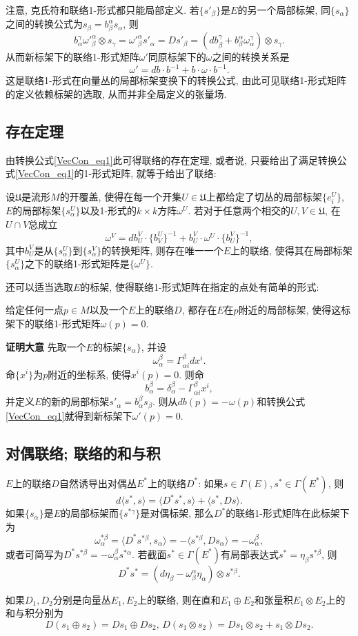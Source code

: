 注意, 克氏符和联络1-形式都只能局部定义. 若$\{s'_\beta\}$是$E$的另一个局部标架, 同$\{s_\alpha\}$之间的转换公式为$s_\beta=b_\beta^\alpha s_\alpha$, 则
$$
b_\alpha^\gamma{\omega'}_{\beta}^{\alpha}\otimes s_\gamma={\omega'}_{\beta}^{\alpha}s'_\alpha=Ds'_\beta=(db_\beta^\gamma+b_\beta^\alpha\omega_\alpha^\gamma)\otimes s_\gamma.
$$
从而新标架下的联络1-形式矩阵$\omega'$同原标架下的$\omega$之间的转换关系是
\begin{equation}\label{VecCon_eq1}
\omega'=db\cdot b^{-1}+b\cdot\omega\cdot b^{-1}.
\end{equation}
这是联络1-形式在向量丛的局部标架变换下的转换公式, 由此可见联络1-形式矩阵的定义依赖标架的选取, 从而并非全局定义的张量场.

\subsection{存在定理}
由转换公式\autoref{VecCon_eq1}此可得联络的存在定理, 或者说, 只要给出了满足转换公式\autoref{VecCon_eq1}的1-形式矩阵, 就等于给出了联络:
\begin{theorem}{}
设$\mathfrak{U}$是流形$M$的开覆盖, 使得在每一个开集$U\in\mathfrak{U}$上都给定了切丛的局部标架$\{e^U_i\}$, $E$的局部标架$\{s^U_\alpha\}$以及1-形式的$k\times k$方阵$\omega^U$. 若对于任意两个相交的$U,V\in\mathfrak{U}$, 在$U\cap V$总成立
$$
\omega^V=db^V_U\cdot \{b_V^U\}^{-1}+b^V_U\cdot\omega^U\cdot \{b^V_U\}^{-1},
$$
其中$b^V_U$是从$\{s^U_\alpha\}$到$\{s^V_\alpha\}$的转换矩阵, 则存在唯一一个$E$上的联络, 使得其在局部标架$\{s^U_\alpha\}$之下的联络1-形式矩阵是$\{\omega^U\}$.
\end{theorem}

还可以适当选取$E$的标架, 使得联络1-形式矩阵在指定的点处有简单的形式:
\begin{theorem}{}
给定任何一点$p\in M$以及一个$E$上的联络$D$, 都存在$E$在$p$附近的局部标架, 使得这标架下的联络1-形式矩阵$\omega(p)=0$.
\end{theorem}
\textbf{证明大意} 先取一个$E$的标架$\{s_\alpha\}$, 并设
$$
\omega^\beta_\alpha=\Gamma_{\alpha i}^\beta dx^i.
$$
命$\{x^i\}$为$p$附近的坐标系, 使得$x^i(p)=0$. 则命
$$
b_\alpha^\beta=\delta_\alpha^\beta-\Gamma_{\alpha i}^\beta x^i,
$$
并定义$E$的新的局部标架$s'_\alpha=b_\alpha^\beta s_\beta$. 则从$db(p)=-\omega(p)$和转换公式\autoref{VecCon_eq1}就得到新标架下$\omega'(p)=0$.

\subsection{对偶联络; 联络的和与积}
$E$上的联络$D$自然诱导出对偶丛$E^*$上的联络$D^*$: 如果$s\in\Gamma(E),s^*\in\Gamma(E^*)$, 则
$$
d\langle s^*,s\rangle=\langle D^*s^*,s\rangle+\langle s^*,Ds\rangle.
$$
如果$\{s_\alpha\}$是$E$的局部标架而$\{s^{*\gamma}\}$是对偶标架, 那么$D^*$的联络1-形式矩阵在此标架下为
$$
\omega^{*\beta}_\alpha
=\langle D^*s^{*\beta},s_\alpha\rangle
=-\langle s^{*\beta},Ds_\alpha\rangle
=-\omega^\beta_\alpha,
$$
或者可简写为$D^*s^{*\beta}=-\omega^\beta_\alpha s^{*\alpha}$. 若截面$s^*\in\Gamma(E^*)$有局部表达式$s^*=\eta_\beta s^{*\beta}$, 则
$$
D^*s^*=(d\eta_\beta-\omega_\beta^\alpha\eta_\alpha)\otimes s^{*\beta}.
$$

如果$D_1,D_2$分别是向量丛$E_1,E_2$上的联络, 则在直和$E_1\oplus E_2$和张量积$E_1\otimes E_2$上的和与积分别为
$$
D(s_1\oplus s_2)=Ds_1\oplus Ds_2,
\,
D(s_1\otimes s_2)=Ds_1\otimes s_2+s_1\otimes Ds_2.
$$